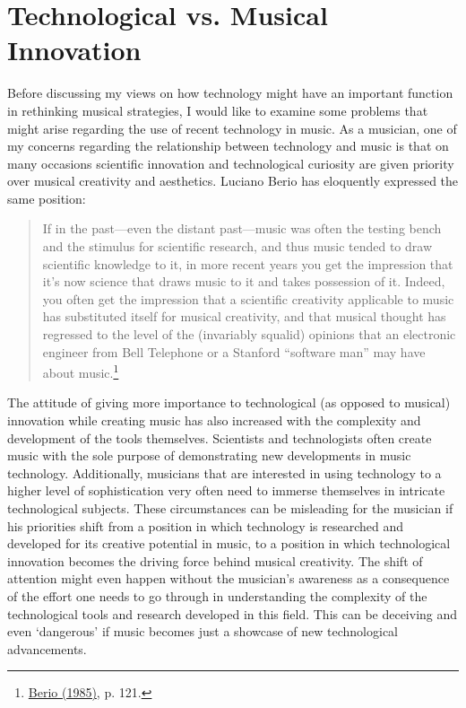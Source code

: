 \section{Technological vs. Musical Innovation}

Before discussing my views on how technology might have an important function in rethinking musical strategies, I would like to examine some problems that might arise regarding the use of recent technology in music. As a musician, one of my concerns regarding the relationship between technology and music is that on many occasions scientific innovation and technological curiosity are given priority over musical creativity and aesthetics. Luciano Berio has eloquently expressed the same position:
\begin{quote}
If in the past---even the distant past---music was often the testing bench and the stimulus for scientific research, and thus music tended to draw scientific knowledge to it, in more recent years you get the impression that it's now science that draws music to it and takes possession of it. Indeed, you often get the impression that a scientific creativity applicable to music has substituted itself for musical creativity, and that musical thought has regressed to the level of the (invariably squalid) opinions that an electronic engineer from Bell Telephone or a Stanford ``software man'' may have about music.\footnote{\hyperlink{berio}{Berio (1985)}, p. 121.} 
\end{quote}
The attitude of giving more importance to technological (as opposed to musical) innovation while creating music has also increased with the complexity and development of the tools themselves. Scientists and technologists often create music with the sole purpose of demonstrating new developments in music technology. Additionally, musicians that are interested in using technology to a higher level of sophistication very often need to immerse themselves in intricate technological subjects. These circumstances can be misleading for the musician if his priorities shift from a position in which technology is researched and developed for its creative potential in music, to a position in which technological innovation becomes the driving force behind musical creativity.  The shift of attention might even happen without the musician's awareness as a consequence of the effort one needs to go through in understanding the complexity of the technological tools and research developed in this field. This can be deceiving and even `dangerous' if music becomes just a showcase of new technological advancements. 

